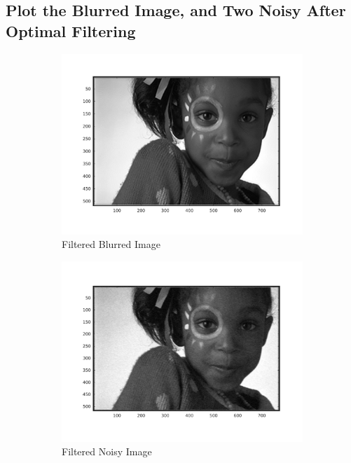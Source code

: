 \documentclass{article}
\begin{document}
\subsection{Plot the Blurred Image, and Two Noisy After Optimal Filtering}
	\begin{figure}[h]
		\begin{subfigure}{0.5\textwidth}
			\includegraphics[width=1.0\textwidth]{nobl.png}
			\caption{Filtered Blurred Image}
		\end{subfigure}
		\begin{subfigure}{0.5\textwidth}
			\includegraphics[width=1.0\textwidth]{non.png}
			\caption{Filtered Noisy Image}
		\end{subfigure}
		\begin{subfigure}{1.0\textwidth}

\end{subfigure}
\end{figure}
\end{document}
